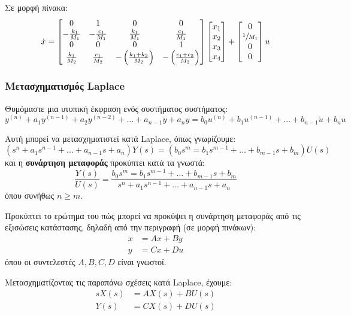 \documentclass[11pt,a4paper,notitlepage,fleqn,final]{article}
\begin{document}
\begin{exercise}
	Σε μορφή πίνακα:
	\[
	\dot x = \left[\begin{matrix}
	0 & 1 & 0 & 0\\
	-\frac{k_1}{M_1} & -\frac{c_1}{M_1} & \frac{k_1}{M_1} & \frac{c_1}{M_1}\\
	0 & 0 & 0 & 1\\
	\frac{k_1}{M_2} & \frac{c_1}{M_2} & -\left(\frac{k_1+k_2}{M_2}\right)
	& -\left(\frac{c_1+c_2}{M_2}\right)
	\end{matrix}\right]\left[\begin{matrix}
	x_1 \\ x_2 \\ x_3 \\ x_4
	\end{matrix}\right] + \left[
	\begin{matrix}
	0 \\ \sfrac{1}{M_1} \\ 0 \\ 0
	\end{matrix}
	\right]u
	\]
\end{exercise}

\subsubsection{Μετασχηματισμός Laplace}
Θυμόμαστε μια υτυπική έκφραση ενός συστήματος συστήματος:
\[
y^{(n)} + a_1y^{(n-1)} + a_2y^{(n-2)} + \dots + a_{n-1}\dot y + a_n y =
b_0 u^{(n)} + b_1u^{(n-1)} + \dots + b_{n-1}\dot u + b_n u
\]

Αυτή μπορεί να μετασχηματιστεί κατά Laplace, όπως γνωρίζουμε:
\[
\left(
s^n + a_1s^{n-1} + \dots + a_{n-1}s + a_n
\right)Y(s) = \left(
b_0s^m = b_1s^{m-1} + \dots + b_{m-1}s+b_m
\right)U(s)
\]
και η \textbf{συνάρτηση μεταφοράς} προκύπτει κατά τα γνωστά:
\[
\frac{Y(s)}{U(s)} = \frac{
	b_0s^m = b_1s^{m-1} + \dots + b_{m-1}s+b_m
	}{
	s^n + a_1s^{n-1} + \dots + a_{n-1}s + a_n
	}
\] όπου συνήθως \( n \geq m \).

Προκύπτει το ερώτημα του πώς μπορεί να προκύψει η συνάρτηση μεταφοράς από τις εξισώσεις
κατάστασης, δηλαδή από την περιγραφή (σε μορφή πινάκων):
\begin{align*}
\dot x &= Ax	+ By\\
y &= Cx + Du
\end{align*}
όπου οι συντελεστές \( A,B,C,D \) είναι γνωστοί.

Μετασχηματίζοντας τις παραπάνω σχέσεις κατά Laplace, έχουμε:
\begin{align*}
	sX(s) &= AX(s) + BU(s) \\
	Y(s) &= CX(s) + DU(s)
\end{align*}
\end{document}

